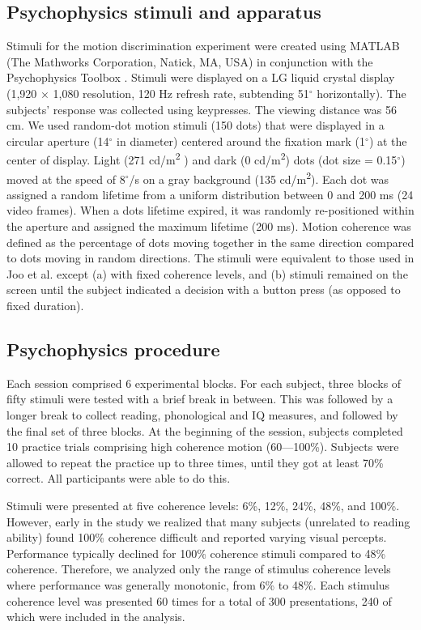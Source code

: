 \documentclass[../uwthesis.tex]{subfiles}
\begin{document}
\subsection{Psychophysics stimuli and apparatus}
Stimuli for the motion discrimination experiment were created using MATLAB (The Mathworks Corporation, Natick, MA, USA) in conjunction with the Psychophysics Toolbox \citep{Brainard1997}. Stimuli were displayed on a LG liquid crystal display (1,920 $\times$ 1,080 resolution, 120 Hz refresh rate, subtending 51$^\circ$ horizontally). The subjects’ response was collected using keypresses. The
viewing distance was 56 cm. We used random-dot motion stimuli (150 dots) that were displayed
in a circular aperture (14$^\circ$ in diameter) centered around the fixation mark (1$^\circ$) at the center of
display. Light (271 cd/m\textsuperscript{2} ) and dark (0 cd/m\textsuperscript{2}) dots (dot size = 0.15$^\circ$) moved at the speed of 8$^\circ$/s on a gray background (135 cd/m\textsuperscript{2}). Each dot was assigned a random lifetime from a uniform distribution between 0 and 200 ms (24 video frames). When a dots lifetime expired, it was randomly re-positioned within the aperture and assigned the maximum lifetime (200 ms). Motion coherence was defined as the percentage of dots moving together in the same direction compared
to dots moving in random directions. The stimuli were equivalent to those used in Joo et al. \citep{Joo2017}
except (a) with fixed coherence levels, and (b) stimuli remained on the screen until the subject indicated a decision with a button press (as opposed to fixed duration).

\subsection{Psychophysics procedure}
Each session comprised 6 experimental blocks. For each subject, three blocks of fifty
stimuli were tested with a brief break in between. This was followed by a longer break to collect
reading, phonological and IQ measures, and followed by the final set of three blocks. At the
beginning of the session, subjects completed 10 practice trials comprising high coherence motion (60---100\%). Subjects were allowed to repeat the practice up to three times, until they got at least 70\% correct. All participants were able to do this.

Stimuli were presented at five coherence levels: 6\%, 12\%, 24\%, 48\%, and 100\%. However, early in the study we realized that many subjects (unrelated to reading ability) found 100\%
coherence difficult and reported varying visual percepts. Performance typically declined for 100\% coherence stimuli compared to 48\% coherence. Therefore, we analyzed only the range of stimulus coherence levels where performance was generally monotonic, from 6\% to 48\%. Each stimulus
coherence level was presented 60 times for a total of 300 presentations, 240 of which were included
in the analysis.
\end{document}
